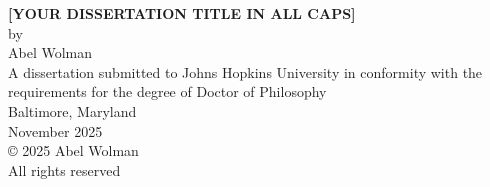 \begin{titlepage}
\thispagestyle{empty}
\begin{center}
    \doublespacing
    \vspace*{1.5in} 
    {\bf \large [YOUR DISSERTATION TITLE IN ALL CAPS]} \\ 
    \vfill 
    {\large by} \\ 
    {\large Abel Wolman}\\ 
    \vfill 
    {\large A dissertation submitted to Johns Hopkins University in conformity with the requirements for the degree of Doctor of Philosophy} \\
    \vfill 
    {\large Baltimore, Maryland} \\ 
    {\large November 2025} \\ 
    \vfill
    {\large \copyright{} 2025 Abel Wolman } \\ 
    {\large All rights reserved} \\ 
    \vfill
\end{center}
\newpage  
\end{titlepage}
